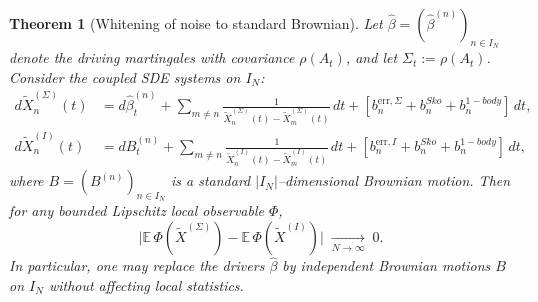 \documentclass[12pt,reqno]{amsart}
\theoremstyle{plain}
\newtheorem{theorem}{Theorem}[section]
\theoremstyle{definition}
\theoremstyle{remark}
\begin{document}
\begin{theorem}[Whitening of noise to standard Brownian]\label{prop:cov-replacement}
Let $\hat\beta=(\hat\beta^{(n)})_{n\in I_N}$ denote the driving martingales
with covariance $\rho(A_t)$, and let $\Sigma_t:=\rho(A_t)$. Consider the coupled SDE
systems on $I_N$:
\begin{align}
d\widetilde X^{(\Sigma)}_n(t) &= d\hat\beta^{(n)}_t
+ \sum_{m\neq n}\frac{1}{\widetilde X^{(\Sigma)}_n(t)-\widetilde X^{(\Sigma)}_m(t)}\,dt+ \left [ b^{\mathrm{err},\Sigma}_n+b_n^{Sko} + b_n^{1-body} \right ]\,dt ,\\
d\widetilde X^{(I)}_n(t) &= dB^{(n)}_t
+ \sum_{m\neq n}\frac{1}{\widetilde X^{(I)}_n(t)-\widetilde X^{(I)}_m(t)}\,dt + \left[ b^{\mathrm{err},I}_n+b_n^{Sko}+ b_n^{1-body} \right ]\,dt,
\end{align}
where $B=(B^{(n)})_{n\in I_N}$ is a standard $|I_N|$–dimensional Brownian motion.
Then for any bounded Lipschitz local observable $\Phi$,
\begin{equation}
\Big|\mathbb E\,\Phi(\widetilde X^{(\Sigma)}) -
\mathbb E\,\Phi(\widetilde X^{(I)})\Big| \;\xrightarrow[N\to\infty]{}\;0.
\end{equation}
In particular, one may replace the drivers $\hat\beta$ by independent
Brownian motions $B$ on $I_N$ without affecting local statistics.
\end{theorem}
\end{document}
